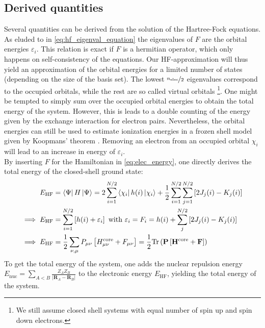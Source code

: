 \subsection{Derived quantities}
\label{subsec:background_hf_derived_quantities}
Several quantities can be derived from the solution of the Hartree-Fock equations. As eluded to in \autoref{eq:hf_eigenval_equation} the eigenvalues of $F$ are the orbital energies $\varepsilon_i$. This relation is exact if $F$ is a hermitian operator, which only happens on self-consistency of the equations. Our HF-approximation will thus yield an approximation of the orbital energies for a limited number of states (depending on the size of the basis set). The lowest $\nicefrac{n_\text{elec}}{2}$ eigenvalues correspond to the occupied orbitals, while the rest are so called virtual orbitals \footnote{We still assume closed shell systems with equal number of spin up and spin down electrons.}. One might be tempted to simply sum over the occupied orbital energies to obtain the total energy of the system. However, this is leads to a double counting of the energy given by the exchange interaction for electron pairs. Nevertheless, the orbital energies can still be used to estimate ionization energies in a frozen shell model given by Koopmans' theorem \parencite{ref:koopmans1934}. Removing an electron from an occupied orbital $\chi_i$ will lead to an increase in energy of $\varepsilon_i$.\\

By inserting $F$ for the Hamiltonian in \autoref{eq:elec_energy}, one directly derives the total energy of the closed-shell ground state: 
\begin{subequations}
\begin{align}
    E_\text{HF} &= \bra{\Psi} H \ket{\Psi} = 2\sum_{i=1}^{N/2} \bra{\chi_i} h(i) \ket{\chi_i}
    + \frac{1}{2}\sum_{i=1}^{N/2}\sum_{j=1}^{N/2} \left[ 2 J_j(i) - K_j(i) \right]\\
    \implies E_\text{HF} &= \sum_{i=1}^{N/2}\left[ h(i) + \varepsilon_i\right] \text{  with  } \varepsilon_i = F_i =  h(i) + \sum_{j}^{N/2} \left[ 2 J_j(i) - K_j(i) \right]\\
    \implies E_\text{HF} &= \frac{1}{2} \sum_{\nu, \mu} P_{\mu \nu} \left[ H_{\mu \nu}^\text{core} + F_{\mu \nu} \right] = \frac{1}{2} \text{Tr} \left( \mathbf{P} \left[ \mathbf{H}^\text{core} + \mathbf{F} \right] \right)
\end{align}
\end{subequations}
To get the total energy of the system, one adds the nuclear repulsion energy $E_\text{nuc} = \sum_{A<B} \frac{Z_A Z_B}{|\mathbf{R}_A - \mathbf{R}_B|}$ to the electronic energy $E_\text{HF}$, yielding the total energy of the system.\\

